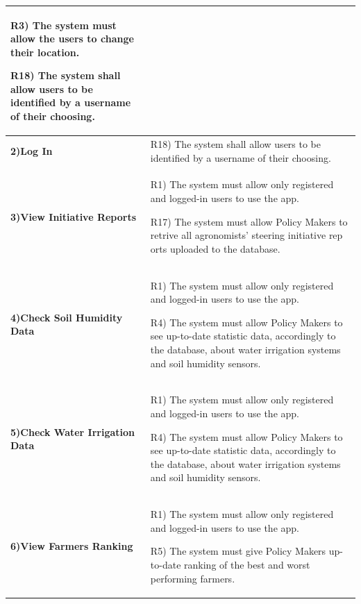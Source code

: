 \documentclass[table, 12pt]{article}
\begin{document}
\begin{itemize}
\begin{longtable}{|p{}|p{}|}
                                                                     R3) The system must allow the users to change their location.
                                                                     
                                                                     R18) The system shall allow users to be identified by a username of their choosing.\\\hline
                    \cellcolor{SpringGreen!50}\textbf{2)Log In}\centering & R18) The system shall allow users to be identified by a username of their choosing. \\\hline
                    \cellcolor{SpringGreen!50}\textbf{3)View Initiative Reports}\centering &  R1) The system must allow only registered and logged-in users to use the app.

                                                                                              R17) The system must allow Policy Makers to retrive all agronomists' steering initiative rep orts uploaded to the database.\\\hline
                    \cellcolor{SpringGreen!50}\textbf{4)Check Soil Humidity Data}\centering &  R1) The system must allow only registered and logged-in users to use the app.

                                                                                               R4) The system must allow Policy Makers to see up-to-date statistic data, accordingly to the database, about water irrigation systems and soil humidity sensors.\\\hline
                    \cellcolor{SpringGreen!50}\textbf{5)Check Water Irrigation Data}\centering &  R1) The system must allow only registered and logged-in users to use the app.

                                                                                                  R4) The system must allow Policy Makers to see up-to-date statistic data, accordingly to the database, about water irrigation systems and soil humidity sensors.\\\hline
                    
                    \cellcolor{SpringGreen!50}\textbf{6)View Farmers Ranking}\centering &  R1) The system must allow only registered and logged-in users to use the app.

                                                                                           R5) The system must give Policy Makers up-to-date ranking of the best and worst performing farmers.


\end{longtable}
\end{itemize}
\end{document}
